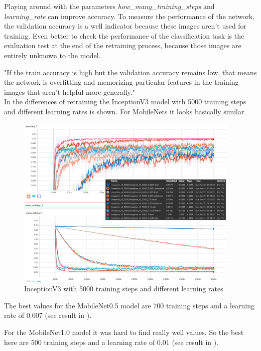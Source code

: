 Playing around with the parameters \textit{how_many_training_steps} and \textit{learning_rate} can improve accuracy. To measure the performance of the network, the validation accuracy is a well indicator because these images aren't used for training. Even better to check the performance of the classification task is the evaluation test at the end of the retraining process, because those images are entirely unknown to the model.

"If the train accuracy is high but the validation accuracy remains low, that means the network is overfitting and memorizing particular features in the training images that aren't helpful more generally." \citep{TensorFlowRetrain2017} \\

In  the differences of retraining the InceptionV3 model with 5000 training steps and different learning rates is shown. For MobileNets it looks basically similar. 

\begin{figure}[htbp]
\centering
\includegraphics[width=0.95\textwidth]{includes/inception5000LR}
\caption[InceptionV3 with 5000 training steps and different learning rates]{InceptionV3 with 5000 training steps and different learning rates}
\label{fig:inception5000LR}
\end{figure}

The best values for the MobileNet0.5 model are 700 training steps and a learning rate of 0.007 (see result in ).

For the MobileNet1.0 model it was hard to find really well values. So the best here are 500 training steps and a learning rate of 0.01 (see result in ).


